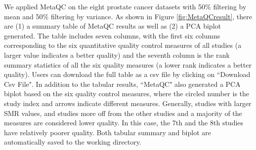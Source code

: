 We applied MetaQC on the eight prostate cancer datasets with 50\% filtering by mean and 50\% filtering by variance.
As shown in Figure \ref{fig:MetaQCresult}, there are {\color{red} (1)} a summary table of MetaQC results as well as {\color{red} (2)} a PCA biplot generated. The table includes seven columns, with the first six columns corresponding to the six quantitative quality control measures of all studies (a larger value indicates a better quality) and the seventh column is the rank summary statistics of all the six quality measures (a lower rank indicates a better quality). Users can download the full table as a csv file by clicking on ``Download Csv File". In addition to the tabular results, ``MetaQC" also generated a PCA biplot based on the six quality control measures, where the circled number is the study index and arrows indicate different measures. Generally, studies with larger SMR values, and studies more off from the other studies and a majority of the measures are considered lower quality. In this case, the 7th and the 8th studies have relatively poorer quality. Both tabular summary and biplot are automatically saved to the working directory. 


